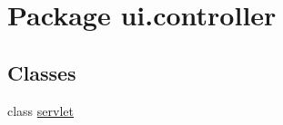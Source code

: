 \hypertarget{namespaceui_1_1controller}{}\section{Package ui.\+controller}
\label{namespaceui_1_1controller}
\subsection*{Classes}
\begin{DoxyCompactItemize}
\item 
class \mbox{\hyperlink{classui_1_1controller_1_1servlet}{servlet}}
\end{DoxyCompactItemize}
